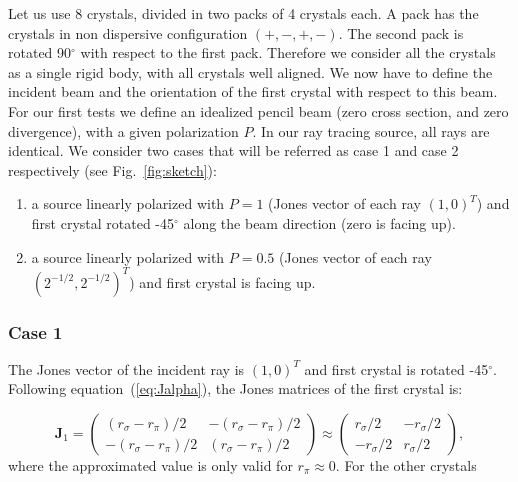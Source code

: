\documentclass{iucr}
\begin{document}
Let us use 8 crystals, divided in two packs of 4 crystals each. A pack has the crystals in non dispersive configuration $(+,-,+,-)$. The second pack is rotated 90$^\circ$ with respect to the first pack. Therefore we consider all the crystals as a single rigid body, with all crystals well aligned. We now have to define the incident beam and the orientation of the first crystal with respect to this beam. For our first tests we define an idealized pencil beam (zero cross section, and zero divergence), with a given polarization $P$. In our ray tracing source, all rays are identical. We consider two cases that will be referred as case 1 and case 2 respectively (see Fig.~\ref{fig:sketch}):
\begin{enumerate}
    \item a source linearly polarized with $P=1$ (Jones vector of each ray $(1,0)^T$) and first crystal rotated -45$^\circ$ along the beam direction (zero is facing up).
    \item a source linearly polarized with $P=0.5$ (Jones vector of each ray $(2^{-1/2},2^{-1/2})^T$) and first crystal is facing up.    
\end{enumerate}

\subsubsection{Case 1}
The Jones vector of the incident ray is $(1,0)^T$ and first crystal is rotated -45$^\circ$. Following equation~(\ref{eq:Jalpha}), the Jones matrices of the first crystal is: 

\begin{equation}\label{eq:Jcase1_xtal1}
    \textbf{J}_1=
    \begin{pmatrix}
(r_\sigma - r_\pi) / 2 & -(r_\sigma - r_\pi) / 2\\
-(r_\sigma - r_\pi) / 2& 
(r_\sigma - r_\pi) / 2
\end{pmatrix}
\approx
    \begin{pmatrix}
r_\sigma  / 2 & -r_\sigma  / 2\\
-r_\sigma / 2& 
r_\sigma  / 2
\end{pmatrix}
,
\end{equation}
where the approximated value is only valid for $r_\pi \approx 0$. For the other crystals
\end{document}
